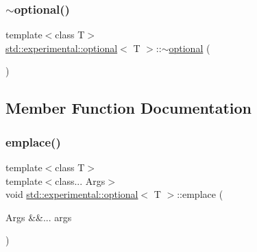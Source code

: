 \mbox{\label{classstd_1_1experimental_1_1optional_a6a0db9c777d56ec7b35fa86811d0d971}} 
\subsubsection{\texorpdfstring{$\sim$optional()}{~optional()}}
{\footnotesize\ttfamily template$<$class T$>$ \\
\mbox{\hyperlink{classstd_1_1experimental_1_1optional}{std\+::experimental\+::optional}}$<$ T $>$\+::$\sim$\mbox{\hyperlink{classstd_1_1experimental_1_1optional}{optional}} (\begin{DoxyParamCaption}{ }\end{DoxyParamCaption})\hspace{0.3cm}{\ttfamily [default]}}



\subsection{Member Function Documentation}
\mbox{\label{classstd_1_1experimental_1_1optional_a6b60e8fad8acbead730a4eb9a8c3b80c}} 
\subsubsection{\texorpdfstring{emplace()}{emplace()}\hspace{0.1cm}{\footnotesize\ttfamily [1/2]}}
{\footnotesize\ttfamily template$<$class T$>$ \\
template$<$class... Args$>$ \\
void \mbox{\hyperlink{classstd_1_1experimental_1_1optional}{std\+::experimental\+::optional}}$<$ T $>$\+::emplace (\begin{DoxyParamCaption}\item[{Args \&\&...}]{args }\end{DoxyParamCaption})\hspace{0.3cm}{\ttfamily [inline]}}

